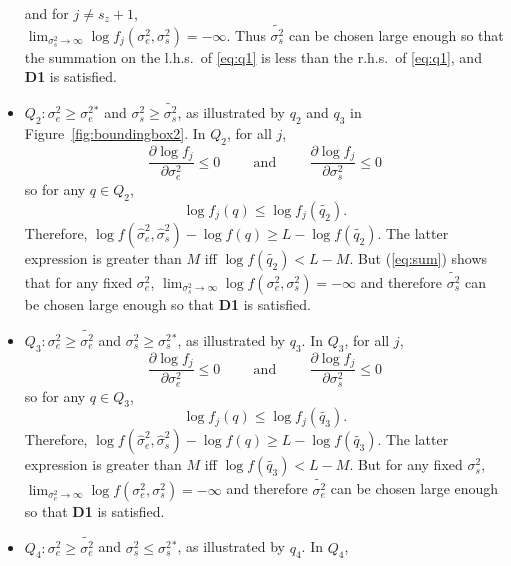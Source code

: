 \documentclass[ejs]{imsart}
\newcommand{\RL}{f}
\newcommand{\logRL}{\log\RL}
\newcommand{\sigssq}{\sigma_s^2}
\newcommand{\sigesq}{\sigma_e^2}
\newcommand{\sshat}{\hat\sigma^2_e,\hat\sigma^2_s}
\newcommand{\logRLss}{\logRL(\sigesq,\sigssq)}
\begin{document}
\begin{itemize}
  and for $j \ne s_z+1$,\\ $\lim_{\sigssq \rightarrow \infty} \logRL_j(\sigesq,\sigssq) = -\infty$.
  Thus $\widetilde{\sigma_s^2}$ can be chosen large enough so that the summation on the
  l.h.s.~of \eqref{eq:q1} is less than the r.h.s.~of \eqref{eq:q1}, and  \textbf{D1} is satisfied.
\item $Q_2: \sigesq \ge \sigesq{}^*$ and $\sigssq \ge \widetilde{\sigssq}$, as illustrated by $q_2$ and $q_3$
  in Figure~\ref{fig:boundingbox2}.  In $Q_2$, for all $j$,
  \begin{equation*}
    \frac{\partial\logRL_j}{\partial\sigesq} \le 0 \hspace{1cm} \text{and} \hspace{1cm}
    \frac{\partial\logRL_j}{\partial\sigssq} \le 0
  \end{equation*}
  so for any $q \in Q_2$,
  \begin{equation*}
    \logRL_j(q) \le \logRL_j(\widetilde{q_2}).
  \end{equation*}
  Therefore, $\logRL(\sshat) - \logRL(q) \ge L - \logRL(\widetilde{q_2})$.  The latter expression is greater than
  $M$ iff $\logRL(\widetilde{q_2}) < L-M$.  But (\ref{eq:sum}) shows that for any fixed
  $\sigesq$, $\lim_{\sigssq \rightarrow \infty} \logRLss = -\infty$ and therefore $\widetilde{\sigma_s^2}$
  can be chosen large enough so that \textbf{D1} is satisfied.
\item $Q_3: \sigesq \ge \widetilde{\sigesq}$ and $\sigssq \ge \sigssq{}^*$, as illustrated by $q_3$.  In $Q_3$,
  for all $j$,
  \begin{equation*}
    \frac{\partial\logRL_j}{\partial\sigesq} \le 0 \hspace{1cm} \text{and} \hspace{1cm}
    \frac{\partial\logRL_j}{\partial\sigssq} \le 0
  \end{equation*}
  so for any $q \in Q_3$,
  \begin{equation*}
    \logRL_j(q) \le \logRL_j(\widetilde{q_3}).
  \end{equation*}
  Therefore, $\logRL(\sshat) - \logRL(q) \ge L - \logRL(\widetilde{q_3})$.  The latter expression is greater than
  $M$ iff $\logRL(\widetilde{q_3}) < L-M$.  But for any fixed $\sigssq$,
  $\lim_{\sigesq \rightarrow \infty} \logRLss = -\infty$ and therefore $\widetilde{\sigma_e^2}$
  can be chosen large enough so that \textbf{D1} is satisfied.
\item $Q_4: \sigesq \ge \widetilde{\sigesq}$ and $\sigssq \le \sigssq{}^*$, as illustrated by $q_4$.  In $Q_4$,

\end{itemize}
\end{document}
